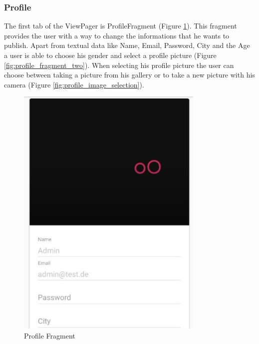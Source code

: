 \subsubsection{Profile}
The first tab of the ViewPager is ProfileFragment (Figure \ref{fig:profile_fragment_one}). This fragment provides the user with a way to change the informations that he wants to publish. Apart from textual data like Name, Email, Password, City and the Age a user is able to choose his gender and select a profile picture (Figure \ref{fig:profile_fragment_two}). When selecting his profile picture the user can choose between taking a picture from his gallery or to take a new picture with his camera (Figure \ref{fig:profile_image_selection}).
\begin{figure}[htbp]
	\includegraphics[width=0.8\textwidth]{images/profile_fragment_one.jpg}
	\centering
	\caption{Profile Fragment}\label{fig:profile_fragment_one}
\end{figure}
